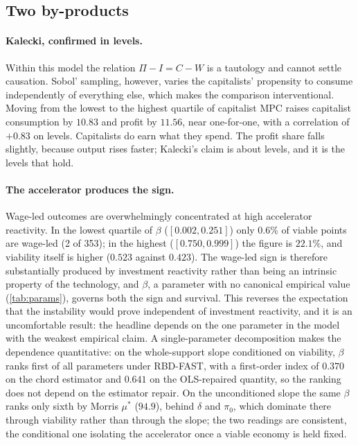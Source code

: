 \subsection{Two by-products}

\paragraph{Kalecki, confirmed in levels.} Within this model the relation
$\Pi - I = C - W$ is a tautology and cannot settle causation. Sobol' sampling,
however, varies the capitalists' propensity to consume independently of
everything else, which makes the comparison interventional. Moving from the
lowest to the highest quartile of capitalist MPC raises capitalist consumption
by $10.83$ and profit by $11.56$, near one-for-one, with a correlation of
$+0.83$ on levels. Capitalists do earn what they spend. The profit share
falls slightly, because output rises faster; Kalecki's claim is about levels,
and it is the levels that hold.

\paragraph{The accelerator produces the sign.} Wage-led outcomes are
overwhelmingly concentrated at high accelerator reactivity. In the lowest
quartile of $\beta$ ($[0.002, 0.251]$) only $0.6\%$ of viable points are
wage-led (2 of 353); in the highest ($[0.750, 0.999]$) the figure is $22.1\%$,
and viability itself is higher ($0.523$ against $0.423$). The wage-led sign is
therefore substantially produced by investment reactivity rather than
being an intrinsic property of the technology, and $\beta$, a parameter with
no canonical empirical value (\cref{tab:params}), governs both the sign and
survival. This reverses the expectation that the instability would prove
independent of investment reactivity, and it is an uncomfortable result: the
headline depends on the one parameter in the model with the weakest empirical
claim. A single-parameter decomposition makes the dependence quantitative: on
the whole-support slope conditioned on viability, $\beta$ ranks first of all
parameters under RBD-FAST, with a first-order index of $0.370$ on the chord
estimator and $0.641$ on the OLS-repaired quantity, so the ranking does not
depend on the estimator repair. On the unconditioned slope the same $\beta$
ranks only sixth by Morris $\mu^{\ast}$ ($94.9$), behind $\delta$ and $\pi_0$,
which dominate there through viability rather than through the slope; the two
readings are consistent, the conditional one isolating the accelerator once a
viable economy is held fixed.
